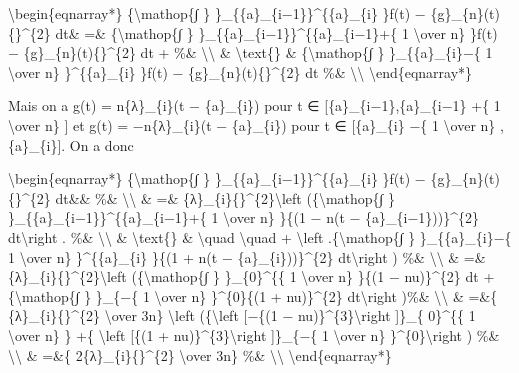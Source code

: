 \documentclass[]{article}
\begin{document}
\textbackslash{}begin\{eqnarray*\} \{\textbackslash{}mathop\{∫ \}
\}\_\{\{a\}\_\{i−1\}\}\^{}\{\{a\}\_\{i\} \}\textbar{}f(t) −
\{g\}\_\{n\}(t)\{\textbar{}\}\^{}\{2\} dt\& =\&
\{\textbackslash{}mathop\{∫ \}
\}\_\{\{a\}\_\{i−1\}\}\^{}\{\{a\}\_\{i−1\}+\{ 1 \textbackslash{}over n\}
\}\textbar{}f(t) − \{g\}\_\{n\}(t)\{\textbar{}\}\^{}\{2\} dt + \%\&
\textbackslash{}\textbackslash{} \& \textbackslash{}text\{\} \&
\{\textbackslash{}mathop\{∫ \} \}\_\{\{a\}\_\{i\}−\{ 1
\textbackslash{}over n\} \}\^{}\{\{a\}\_\{i\} \}\textbar{}f(t) −
\{g\}\_\{n\}(t)\{\textbar{}\}\^{}\{2\} dt \%\&
\textbackslash{}\textbackslash{} \textbackslash{}end\{eqnarray*\}

Mais on a g(t) = n\{λ\}\_\{i\}(t − \{a\}\_\{i\}) pour t ∈
{[}\{a\}\_\{i−1\},\{a\}\_\{i−1\} +\{ 1 \textbackslash{}over n\} {]} et
g(t) = −n\{λ\}\_\{i\}(t − \{a\}\_\{i\}) pour t ∈ {[}\{a\}\_\{i\} −\{ 1
\textbackslash{}over n\} ,\{a\}\_\{i\}{]}. On a donc

\textbackslash{}begin\{eqnarray*\} \{\textbackslash{}mathop\{∫ \}
\}\_\{\{a\}\_\{i−1\}\}\^{}\{\{a\}\_\{i\} \}\textbar{}f(t) −
\{g\}\_\{n\}(t)\{\textbar{}\}\^{}\{2\} dt\&\& \%\&
\textbackslash{}\textbackslash{} \& =\&
\textbar{}\{λ\}\_\{i\}\{\textbar{}\}\^{}\{2\}\textbackslash{}left
(\{\textbackslash{}mathop\{∫ \}
\}\_\{\{a\}\_\{i−1\}\}\^{}\{\{a\}\_\{i−1\}+\{ 1 \textbackslash{}over n\}
\}\{(1 − n(t − \{a\}\_\{i−1\}))\}\^{}\{2\} dt\textbackslash{}right .
\%\& \textbackslash{}\textbackslash{} \& \textbackslash{}text\{\} \&
\textbackslash{}quad \textbackslash{}quad + \textbackslash{}left
.\{\textbackslash{}mathop\{∫ \} \}\_\{\{a\}\_\{i\}−\{ 1
\textbackslash{}over n\} \}\^{}\{\{a\}\_\{i\} \}\{(1 + n(t −
\{a\}\_\{i\}))\}\^{}\{2\} dt\textbackslash{}right ) \%\&
\textbackslash{}\textbackslash{} \& =\&
\textbar{}\{λ\}\_\{i\}\{\textbar{}\}\^{}\{2\}\textbackslash{}left
(\{\textbackslash{}mathop\{∫ \} \}\_\{0\}\^{}\{\{ 1 \textbackslash{}over
n\} \}\{(1 − nu)\}\^{}\{2\} dt +\{\textbackslash{}mathop\{∫ \} \}\_\{−\{
1 \textbackslash{}over n\} \}\^{}\{0\}\{(1 + nu)\}\^{}\{2\}
dt\textbackslash{}right )\%\& \textbackslash{}\textbackslash{} \& =\&\{
\textbar{}\{λ\}\_\{i\}\{\textbar{}\}\^{}\{2\} \textbackslash{}over 3n\}
\textbackslash{}left (\{\textbackslash{}left {[}−\{(1 −
nu)\}\^{}\{3\}\textbackslash{}right {]}\}\_\{ 0\}\^{}\{\{ 1
\textbackslash{}over n\} \} +\{ \textbackslash{}left {[}\{(1 +
nu)\}\^{}\{3\}\textbackslash{}right {]}\}\_\{−\{ 1 \textbackslash{}over
n\} \}\^{}\{0\}\textbackslash{}right ) \%\&
\textbackslash{}\textbackslash{} \& =\&\{
2\textbar{}\{λ\}\_\{i\}\{\textbar{}\}\^{}\{2\} \textbackslash{}over 3n\}
\%\& \textbackslash{}\textbackslash{} \textbackslash{}end\{eqnarray*\}
\end{document}
